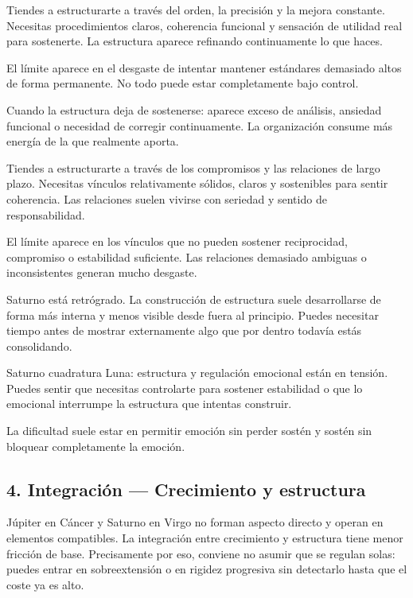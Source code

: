 \documentclass[11pt,a4paper]{article}
\begin{document}
Tiendes a estructurarte a través del orden, la precisión y la mejora constante. Necesitas procedimientos claros, coherencia funcional y sensación de utilidad real para sostenerte. La estructura aparece refinando continuamente lo que haces.

El límite aparece en el desgaste de intentar mantener estándares demasiado altos de forma permanente. No todo puede estar completamente bajo control.

Cuando la estructura deja de sostenerse: aparece exceso de análisis, ansiedad funcional o necesidad de corregir continuamente. La organización consume más energía de la que realmente aporta.

Tiendes a estructurarte a través de los compromisos y las relaciones de largo plazo. Necesitas vínculos relativamente sólidos, claros y sostenibles para sentir coherencia. Las relaciones suelen vivirse con seriedad y sentido de responsabilidad.

El límite aparece en los vínculos que no pueden sostener reciprocidad, compromiso o estabilidad suficiente. Las relaciones demasiado ambiguas o inconsistentes generan mucho desgaste.

Saturno está retrógrado. La construcción de estructura suele desarrollarse de forma más interna y menos visible desde fuera al principio. Puedes necesitar tiempo antes de mostrar externamente algo que por dentro todavía estás consolidando.

Saturno cuadratura Luna: estructura y regulación emocional están en tensión. Puedes sentir que necesitas controlarte para sostener estabilidad o que lo emocional interrumpe la estructura que intentas construir.

La dificultad suele estar en permitir emoción sin perder sostén y sostén sin bloquear completamente la emoción.

\vspace{0.8cm}


\subsection{4. Integración — Crecimiento y estructura}

Júpiter en Cáncer y Saturno en Virgo no forman aspecto directo y operan en elementos compatibles. La integración entre crecimiento y estructura tiene menor fricción de base. Precisamente por eso, conviene no asumir que se regulan solas: puedes entrar en sobreextensión o en rigidez progresiva sin detectarlo hasta que el coste ya es alto.
\end{document}
